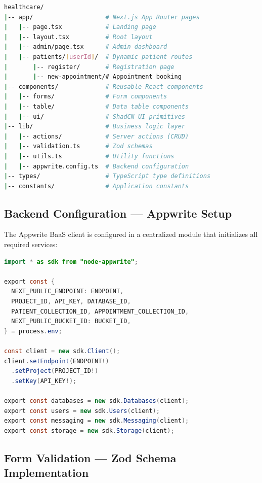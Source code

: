\documentclass[11pt,a4paper]{article}
\begin{document}
\begin{lstlisting}[language=bash, caption={Project Directory Structure}]
healthcare/
|-- app/                    # Next.js App Router pages
|   |-- page.tsx            # Landing page
|   |-- layout.tsx          # Root layout
|   |-- admin/page.tsx      # Admin dashboard
|   |-- patients/[userId]/  # Dynamic patient routes
|       |-- register/       # Registration page
|       |-- new-appointment/# Appointment booking
|-- components/             # Reusable React components
|   |-- forms/              # Form components
|   |-- table/              # Data table components
|   |-- ui/                 # ShadCN UI primitives
|-- lib/                    # Business logic layer
|   |-- actions/            # Server actions (CRUD)
|   |-- validation.ts       # Zod schemas
|   |-- utils.ts            # Utility functions
|   |-- appwrite.config.ts  # Backend configuration
|-- types/                  # TypeScript type definitions
|-- constants/              # Application constants
\end{lstlisting}

\subsection{Backend Configuration --- Appwrite Setup}

The Appwrite BaaS client is configured in a centralized module that initializes all required services:

\begin{lstlisting}[language=Java, caption={Appwrite Client Configuration (appwrite.config.ts)}]
import * as sdk from "node-appwrite";

export const {
  NEXT_PUBLIC_ENDPOINT: ENDPOINT,
  PROJECT_ID, API_KEY, DATABASE_ID,
  PATIENT_COLLECTION_ID, APPOINTMENT_COLLECTION_ID,
  NEXT_PUBLIC_BUCKET_ID: BUCKET_ID,
} = process.env;

const client = new sdk.Client();
client.setEndpoint(ENDPOINT!)
  .setProject(PROJECT_ID!)
  .setKey(API_KEY!);

export const databases = new sdk.Databases(client);
export const users = new sdk.Users(client);
export const messaging = new sdk.Messaging(client);
export const storage = new sdk.Storage(client);
\end{lstlisting}

\subsection{Form Validation --- Zod Schema Implementation}
\end{document}
